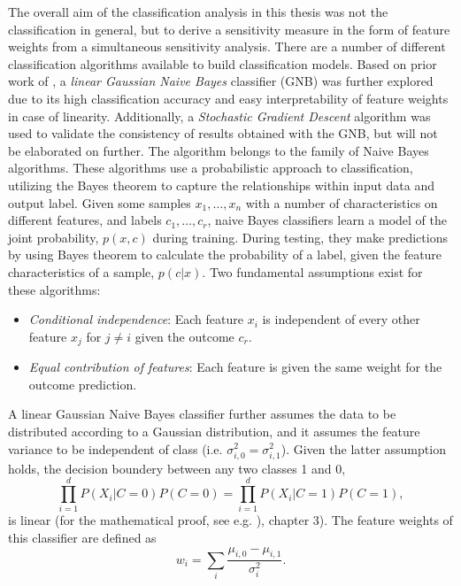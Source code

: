 \documentclass[a4paper, 12pt]{scrreprt}
\begin{document}
The overall aim of the classification analysis in this thesis was not the classification in general, but to derive a sensitivity measure in the form of feature weights from a simultaneous sensitivity analysis. There are a number of different classification algorithms available to build classification models. Based on prior work of \textcite{nastase2016}, a \textit{linear Gaussian Naive Bayes} classifier (GNB) was further explored due to its high classification accuracy and easy interpretability of feature weights in case of linearity. Additionally, a \textit{Stochastic Gradient Descent} algorithm was used to validate the consistency of results obtained with the GNB, but will not be elaborated on further. \newline
The algorithm belongs to the family of Naive Bayes algorithms. These algorithms use a probabilistic approach to classification, utilizing the Bayes theorem to capture the relationships within input data and output label. Given some samples $x_1, \ldots, x_n$ with a number of characteristics on different features, and labels $c_1, \ldots, c_r$, naive Bayes classifiers learn a model of the joint probability, $p(x, c)$ during training. During testing, they make predictions by using Bayes theorem to calculate the probability of a label, given the feature characteristics of a sample, $p(c|x)$. Two fundamental assumptions exist for these algorithms: \newline 
\begin{itemize}
	\item \textit{Conditional independence}: Each feature $x_i$ is independent of every other feature $x_j$ for $j \neq i$ given the outcome $c_r$.
	\item \textit{Equal contribution of features}:  Each feature is given the same weight for the outcome prediction. 
\end{itemize} 
A linear Gaussian Naive Bayes classifier further assumes the data to be distributed according to a Gaussian distribution, and it assumes the feature variance to be independent of class (i.e. $\sigma_{i, 0}^2 = \sigma_{i, 1}^2$). Given the latter assumption holds, the decision boundery between any two classes 1 and 0,
\begin{equation}
\prod_{i=1}^{d} P(X_i |C = 0)P(C=0) = \prod_{i=1}^{d} P(X_i |C = 1)P(C=1),
\end{equation}
is linear (for the mathematical proof, see e.g. \textcite{DBLP:books/daglib/0087929}), chapter 3). The feature weights of this classifier are defined as
\begin{equation}
w_i = \sum_{i}\frac{\mu_{i, 0}-\mu_{i, 1}}{\sigma_{i}^{2}}.
\end{equation}
\end{document}
